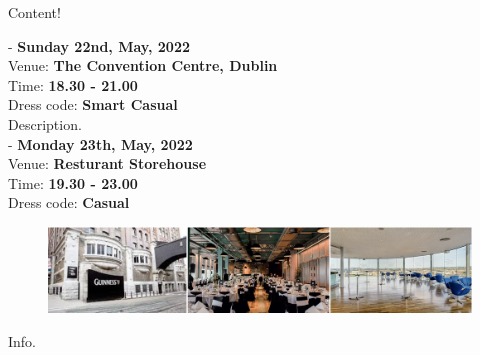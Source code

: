 Content! \\\leavevmode\newline

 -
 {\normalsize \textbf{Sunday 22nd, May, 2022}\\
 Venue: \textbf{The Convention Centre, Dublin}\\
 Time: \textbf{18.30 - 21.00}\\
 Dress code: \textbf{Smart Casual} }\\

Description.\\

 -
 {\normalsize \textbf{Monday 23th, May, 2022}\\
 Venue: \textbf{Resturant Storehouse}\\
 Time: \textbf{19.30 - 23.00}\\
 Dress code: \textbf{Casual}} \\

\begin{figure}[h!]
  \centering
      \includegraphics[width=0.9\linewidth]{examples/handbook_coling25/social_event/images/dinner.png}
\end{figure}

Info.